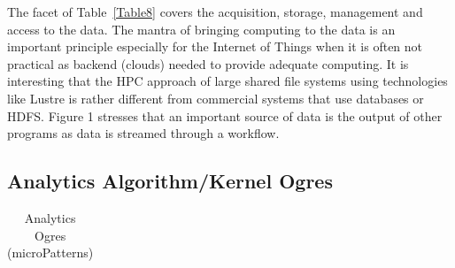 \documentclass{acm_proc_article-sp}
\begin{document}
The facet of Table~\ref{Table8} covers the acquisition, storage, management and access to the data. The mantra of bringing computing to the data is an important principle especially for the Internet of Things when it is often not practical as backend (clouds) needed to provide adequate computing. It is interesting that the HPC approach of large shared file systems using technologies like Lustre is rather different from commercial systems that use databases or HDFS.  Figure 1 stresses that an important source of data is the output of other programs as data is streamed through a workflow.

\subsection{Analytics Algorithm/Kernel Ogres}
\begin{table}
\centering
\caption{Analytics Ogres (microPatterns)}
\label{Table9}
\begin{tabular}{|p{12cm}|} \hline


\end{tabular}
\end{table}
\end{document}
